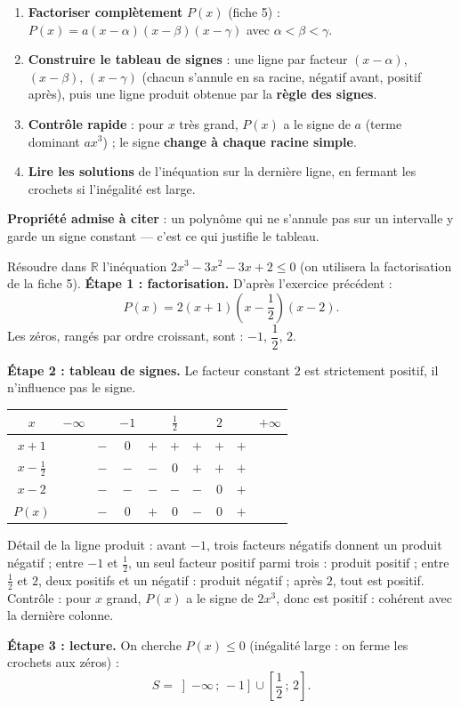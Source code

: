 \documentclass[11pt]{article}
\begin{document}
\begin{methode}
\begin{enumerate}
\item \textbf{Factoriser complètement} $P(x)$ (fiche 5) : $P(x) = a(x-\alpha)(x-\beta)(x-\gamma)$ avec $\alpha < \beta < \gamma$.
\item \textbf{Construire le tableau de signes} : une ligne par facteur $(x-\alpha)$, $(x-\beta)$, $(x-\gamma)$ (chacun s'annule en sa racine, négatif avant, positif après), puis une ligne produit obtenue par la \textbf{règle des signes}.
\item \textbf{Contrôle rapide} : pour $x$ très grand, $P(x)$ a le signe de $a$ (terme dominant $ax^3$) ; le signe \textbf{change à chaque racine simple}.
\item \textbf{Lire les solutions} de l'inéquation sur la dernière ligne, en fermant les crochets si l'inégalité est large.
\end{enumerate}
\textbf{Propriété admise à citer} : un polynôme qui ne s'annule pas sur un intervalle y garde un signe constant — c'est ce qui justifie le tableau.
\end{methode}

\begin{exoresolu}
Résoudre dans $\mathbb{R}$ l'inéquation $2x^3 - 3x^2 - 3x + 2 \leq 0$ (on utilisera la factorisation de la fiche 5).
\tcblower
\textbf{Étape 1 : factorisation.} D'après l'exercice précédent :
\[ P(x) = 2(x+1)\left(x-\frac{1}{2}\right)(x-2). \]
Les zéros, rangés par ordre croissant, sont : $-1$, $\dfrac{1}{2}$, $2$.

\textbf{Étape 2 : tableau de signes.} Le facteur constant $2$ est strictement positif, il n'influence pas le signe.
\begin{center}
\begin{tabular}{|c|ccccccccc|}\hline
$x$ & $-\infty$ & & $-1$ & & $\frac{1}{2}$ & & $2$ & & $+\infty$ \\ \hline
$x+1$ & & $-$ & $0$ & $+$ & $+$ & $+$ & $+$ & $+$ & \\ \hline
$x-\frac{1}{2}$ & & $-$ & $-$ & $-$ & $0$ & $+$ & $+$ & $+$ & \\ \hline
$x-2$ & & $-$ & $-$ & $-$ & $-$ & $-$ & $0$ & $+$ & \\ \hline
$P(x)$ & & $-$ & $0$ & $+$ & $0$ & $-$ & $0$ & $+$ & \\ \hline
\end{tabular}
\end{center}
Détail de la ligne produit : avant $-1$, trois facteurs négatifs donnent un produit négatif ; entre $-1$ et $\tfrac12$, un seul facteur positif parmi trois : produit positif ; entre $\tfrac12$ et $2$, deux positifs et un négatif : produit négatif ; après $2$, tout est positif. Contrôle : pour $x$ grand, $P(x)$ a le signe de $2x^3$, donc est positif : cohérent avec la dernière colonne.

\textbf{Étape 3 : lecture.} On cherche $P(x) \leq 0$ (inégalité large : on ferme les crochets aux zéros) :
\[ S = \left]-\infty\,;\,-1\right] \cup \left[\frac{1}{2}\,;\,2\right]. \]
\end{exoresolu}
\end{document}
